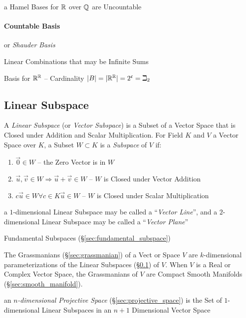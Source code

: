 a Hamel Bases for $\mathbb{R}$ over $\mathbb{Q}$ are Uncountable



\paragraph{Countable Basis}\label{sec:countable_basis}\hfill

or \emph{Shauder Basis}

Linear Combinations that may be Infinite Sums

Basis for $\mathbb{R}^{\mathbb{R}}$ -- Cardinality
$|B| = |\mathbb{R}^{\mathbb{R}}| = 2^\mathfrak{c} = \beth_2$



\subsection{Linear Subspace}\label{sec:linear_subspace}

A \emph{Linear Subspace} (or \emph{Vector Subspace}) is a Subset of a Vector
Space that is Closed under Addition and Scalar Multiplication. For Field $K$
and $V$ a Vector Space over $K$, a Subset $W \subset K$ is a \emph{Subspace} of
$V$ if:
\begin{enumerate}
  \item $\vec{0} \in W$ -- the Zero Vector is in $W$
  \item $\vec{u}, \vec{v} \in W \Rightarrow \vec{u} + \vec{v} \in W$
    -- $W$ is Closed under Vector Addition
  \item $c\vec{u} \in W \forall c \in K \vec{u} \in W$
    -- $W$ is Closed under Scalar Multiplication
\end{enumerate}

a $1$-dimensional Linear Subspace may be called a ``\emph{Vector Line}'', and a
$2$-dimensional Linear Subspace may be called a ``\emph{Vector Plane}''

\fist Fundamental Subspaces (\S\ref{sec:fundamental_subspace})

The Grassmanians (\S\ref{sec:grassmanian}) of a Vect or Space $V$ are
$k$-dimensional parameterizations of the Linear Subspaces
(\S\ref{sec:linear_subspace}) of $V$. When $V$ is a Real or Complex Vector
Space, the Grassmanians of $V$ are Compact Smooth Manifolds
(\S\ref{sec:smooth_manifold}).

\fist an \emph{$n$-dimensional Projective Space} (\S\ref{sec:projective_space})
is the Set of $1$-dimensional Linear Subspaces in an $n+1$ Dimensional Vector
Space

